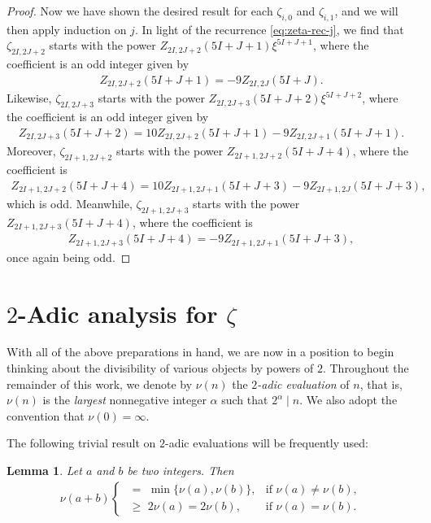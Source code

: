 \documentclass[12pt,reqno]{amsart}
\numberwithin{equation}{section}
\theoremstyle{theorem}
\newtheorem{lemma}[theorem]{Lemma}
\theoremstyle{definition}
\begin{document}
\begin{proof}
	Now we have shown the desired result for each $\zeta_{i,0}$ and $\zeta_{i,1}$, and we will then apply induction on $j$. In light of the recurrence \eqref{eq:zeta-rec-j}, we find that $\zeta_{2I,2J+2}$ starts with the power $Z_{2I,2J+2}(5I+J+1)\xi^{5I+J+1}$, where the coefficient is an odd integer given by
	\begin{align*}
		Z_{2I,2J+2}(5I+J+1) = -9Z_{2I,2J}(5I+J).
	\end{align*}
	Likewise, $\zeta_{2I,2J+3}$ starts with the power $Z_{2I,2J+3}(5I+J+2)\xi^{5I+J+2}$, where the coefficient is an odd integer given by
	\begin{align*}
		Z_{2I,2J+3}(5I+J+2) = 10Z_{2I,2J+2}(5I+J+1) - 9Z_{2I,2J+1}(5I+J+1).
	\end{align*}
	Moreover, $\zeta_{2I+1,2J+2}$ starts with the power $Z_{2I+1,2J+2}(5I+J+4)$, where the coefficient is
	\begin{align*}
		Z_{2I+1,2J+2}(5I+J+4) = 10 Z_{2I+1,2J+1}(5I+J+3) - 9 Z_{2I+1,2J}(5I+J+3),
	\end{align*}
	which is odd. Meanwhile, $\zeta_{2I+1,2J+3}$ starts with the power $Z_{2I+1,2J+3}(5I+J+4)$, where the coefficient is
	\begin{align*}
		Z_{2I+1,2J+3}(5I+J+4) = - 9 Z_{2I+1,2J+1}(5I+J+3),
	\end{align*}
	once again being odd.
\end{proof}

\section{$2$-Adic analysis for $\zeta$}

With all of the above preparations in hand, we are now in a position to begin thinking about the divisibility of various objects by powers of $2$. Throughout the remainder of this work, we denote by $\nu(n)$ the \emph{$2$-adic evaluation} of $n$, that is, $\nu(n)$ is the \emph{largest} nonnegative integer $\alpha$ such that $2^\alpha\mid n$. We also adopt the convention that $\nu(0) = \infty$.

The following trivial result on $2$-adic evaluations will be frequently used:

\begin{lemma}
	Let $a$ and $b$ be two integers. Then
	\begin{align}\label{eq:2-adic-add}
		\nu(a+b)\begin{cases}
			\,\,=\,\, \min\{\nu(a),\nu(b)\}, & \text{if $\nu(a)\ne \nu(b)$},\\[6pt]
			\,\,\ge\,\, 2\nu(a)=2\nu(b), & \text{if $\nu(a)= \nu(b)$}.
		\end{cases}
	\end{align}
\end{lemma}
\end{document}

